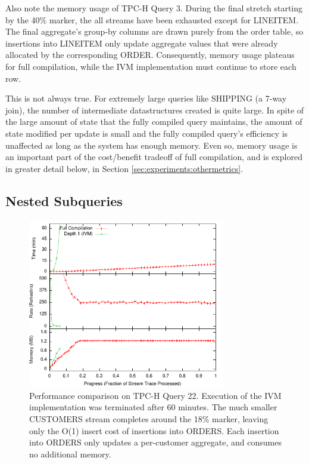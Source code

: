 Also note the memory usage of TPC-H Query 3.  During the final stretch starting by the 40\% marker, the all streams have been exhausted except for LINEITEM.  The final aggregate's group-by columns are drawn purely from the order table, so insertions into LINEITEM only update aggregate values that were already  allocated by the corresponding ORDER.  Consequently, memory usage plateaus for full compilation, while the IVM implementation must continue to store each row.

This is not always true.  For extremely large queries like SHIPPING (a 7-way join), the number of intermediate datastructures created is quite large.  In spite of the large amount of state that the fully compiled query maintains, the amount of state modified per update is small and the fully compiled query's efficiency is unaffected as long as the system has enough memory.  Even so, memory usage is an important part of the cost/benefit tradeoff of full compilation, and is explored in greater detail below, in Section \ref{sec:experiments:othermetrics}.

\subsection{Nested Subqueries}

\begin{figure}
\begin{center}
\includegraphics[width=3.4in]{../graphs/graphs/unified_tpch22.pdf}
\caption{Performance comparison on TPC-H Query 22.  Execution of the IVM implementation was terminated after 60 minutes.  The much smaller CUSTOMERS stream completes around the 18\% marker, leaving only the O(1) insert cost of insertions into ORDERS.  Each insertion into ORDERS only updates a per-customer aggregate, and consumes no additional memory.}
\label{fig:experiments:tpch22}
\end{center}
\end{figure}

